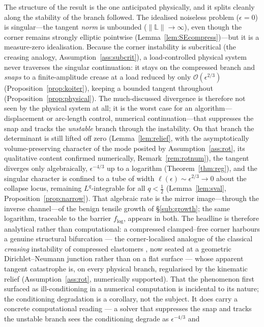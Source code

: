 The structure of the result is the one anticipated physically, and it splits cleanly along the stability of the branch
followed. The idealised noiseless problem ($\epsilon=0$) is singular---the tangent \emph{norm} is unbounded
($\|\mathbb{L}\|\to\infty$), even though the corner remains strongly elliptic pointwise
(Lemma~\ref{lem:SEcompress})---but it is a measure-zero idealisation. Because the corner instability is subcritical (the creasing analogy,
Assumption~\ref{ass:subcrit}), a load-controlled physical system never traverses the singular continuation: it stays on
the compressed branch and \emph{snaps} to a finite-amplitude crease at a load reduced by only
$\mathcal{O}(\epsilon^{2/3})$ (Proposition~\ref{prop:koiter}), keeping a bounded tangent throughout
(Proposition~\ref{prop:physical}). The much-discussed divergence is therefore not seen by the physical system at all;
it is the worst case for an algorithm---displacement or arc-length control, numerical continuation---that suppresses
the snap and tracks the \emph{unstable} branch through the instability. On that branch the determinant is still lifted
off zero (Lemma~\ref{lem:relief}, with the asymptotically volume-preserving character of the mode posited by
Assumption~\ref{ass:rot}, its qualitative content confirmed numerically, Remark~\ref{rem:rotnum}), the tangent
diverges only algebraically,
$\epsilon^{-4/3}$ up to a logarithm
(Theorem~\ref{thm:reg}), and the singular character is confined to a tube of width
$\ell(\epsilon)\sim\epsilon^{2/3}\to0$ about the collapse locus, remaining $L^q$-integrable for all $q<\tfrac12$
(Lemma~\ref{lem:sval}, Proposition~\ref{prop:narrow}). That algebraic rate is the mirror image---through the inverse
channel---of the benign tensile growth of \S\ref{sub:growth}; the same logarithm, traceable to the barrier $f_{\log}$,
appears in both. The headline is therefore analytical rather than computational: a compressed clamped--free corner
harbours a genuine structural bifurcation --- the corner-localised analogue of the classical \emph{creasing} instability
of compressed elastomers \cite{Biot1963,Hong2009}, now seated at a geometric Dirichlet--Neumann junction rather than on a
flat surface --- whose apparent tangent catastrophe is, on every physical branch, regularised by the
kinematic relief (Assumption~\ref{ass:rot}, numerically supported). That the phenomenon first surfaced as ill-conditioning in a numerical computation is incidental to its
nature; the conditioning degradation is a corollary, not the subject. It does carry a concrete computational reading ---
a solver that suppresses the snap and tracks the unstable branch sees the conditioning degrade as $\epsilon^{-4/3}$ and
